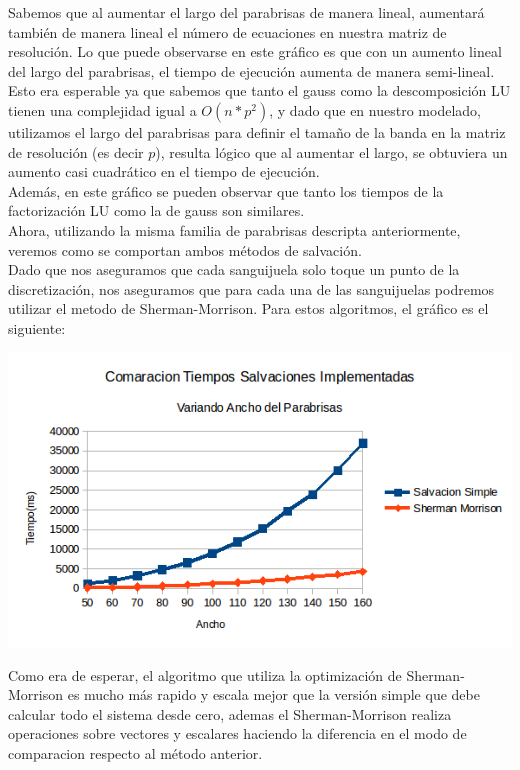 Sabemos que al aumentar el largo del parabrisas de manera lineal, aumentará también de manera lineal el número de ecuaciones en nuestra matriz de resolución. Lo que puede observarse en este gráfico es que con un aumento lineal del largo del parabrisas, el tiempo de ejecución aumenta de manera semi-lineal. Esto era esperable ya que sabemos que tanto el gauss como la descomposición LU tienen una complejidad igual a $O(n*p^2)$, y dado que en nuestro modelado, utilizamos el largo del parabrisas para definir el tamaño de la banda en la matriz de resolución (es decir $p$), resulta lógico que al aumentar el largo, se obtuviera un aumento casi cuadrático en el tiempo de ejecución.
\\
Además, en este gráfico se pueden observar que tanto los tiempos de la factorización LU como la de gauss son similares.
\\
Ahora, utilizando la misma familia de parabrisas descripta anteriormente, veremos como se comportan ambos métodos de salvación.
\\
Dado que nos aseguramos que cada sanguijuela solo toque un punto de la discretización, nos aseguramos que para cada una de las sanguijuelas podremos utilizar el metodo de Sherman-Morrison. Para estos algoritmos, el gráfico es el siguiente:
\\
\begin{center}
 \includegraphics[width=400pt]{imagenes/testeo/anchoSalv.png}
\end{center}

Como era de esperar, el algoritmo que utiliza la optimización de Sherman-Morrison es mucho más rapido y escala mejor que la versión simple que debe calcular todo el sistema desde cero, ademas el Sherman-Morrison realiza operaciones sobre vectores y escalares haciendo la diferencia en el modo de comparacion respecto al método anterior.

